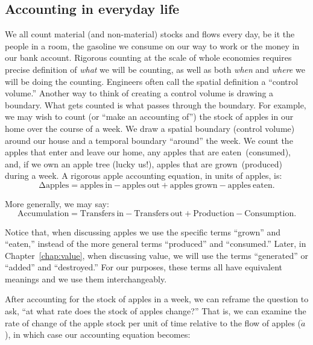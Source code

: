 
\subsection{Accounting in everyday life}
\label{sec:accounting_in_everyday_life}

We all count material (and non-material) stocks and flows every day,
be it the people in a room, the gasoline we consume on our way to work
or the money in our bank account.
Rigorous counting at the scale of whole economies 
requires precise definition of
\emph{what} we will be counting,
as well as both \emph{when} and \emph{where} 
we will be doing the counting. 
Engineers often call the spatial definition a ``control volume.'' 
Another way to think of creating a
control volume is drawing a boundary. 
What gets counted is what passes through the boundary.
For example, 
we may wish to count (or ``make an accounting of'') 
the stock of apples in our home over the course of a week. 
We draw a spatial boundary (control volume) around our house 
and a temporal boundary ``around'' the week.
We count the apples that enter and leave our home, any
apples that are eaten~(consumed),
and, if we own an apple tree (lucky us!), 
apples that are grown~(produced) during a week. 
A rigorous apple accounting equation, in units of apples, is:
\begin{equation}
	\mathrm{\Delta}\mathrm{apples} 
	= \mathrm{apples~in} 
	- \mathrm{apples~out} 
	+ \mathrm{apples~grown} 
	- \mathrm{apples~eaten}.
\end{equation}

\noindent{}More generally, we may say:
\begin{equation}
	\mathrm{Accumulation}
	= \mathrm{Transfers~in} 
	- \mathrm{Transfers~out}
	+ \mathrm{Production}
	- \mathrm{Consumption}.
\end{equation}

Notice that, when discussing apples we use the specific terms 
``grown'' and ``eaten,'' 
instead of the more general terms ``produced'' and ``consumed.''
Later, in Chapter~\ref{chap:value}, when discussing value, we will use the terms
``generated'' or ``added'' and ``destroyed.'' 
For our purposes, these terms all have equivalent
meanings and we use them interchangeably.

After accounting for the stock of apples in a week,
we can reframe the question to ask,
``at what rate does the stock of apples change?'' 
That is, we can examine the rate of
change of the apple stock per unit of time 
relative to the flow of apples 
($\dot{a}$), 
in which case our accounting equation becomes:

